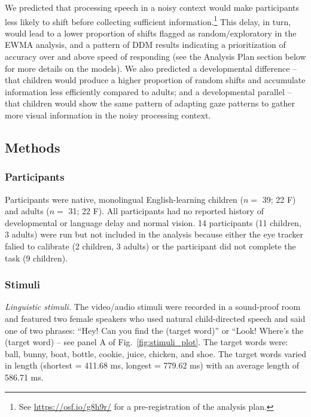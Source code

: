 \documentclass[english,floatsintext,man]{apa6}
\theoremstyle{definition}
\theoremstyle{definition}
\theoremstyle{definition}
\theoremstyle{remark}
\begin{document}
We predicted that processing speech in a noisy context would make
participants less likely to shift before collecting sufficient
information.\footnote{See \url{https://osf.io/g8h9r/} for a
  pre-registration of the analysis plan.} This delay, in turn, would
lead to a lower proportion of shifts flagged as random/exploratory in
the EWMA analysis, and a pattern of DDM results indicating a
prioritization of accuracy over and above speed of responding (see the
Analysis Plan section below for more details on the models). We also
predicted a developmental difference -- that children would produce a
higher proportion of random shifts and accumulate information less
efficiently compared to adults; and a developmental parallel -- that
children would show the same pattern of adapting gaze patterns to gather
more visual information in the noisy processing context.

\hypertarget{methods-2}{%
\subsection{Methods}\label{methods-2}}

\hypertarget{participants-2}{%
\subsubsection{Participants}\label{participants-2}}

Participants were native, monolingual English-learning children (\(n=\)
39; 22 F) and adults (\(n=\) 31; 22 F). All participants had no reported
history of developmental or language delay and normal vision. 14
participants (11 children, 3 adults) were run but not included in the
analysis because either the eye tracker falied to calibrate (2 children,
3 adults) or the participant did not complete the task (9 children).

\hypertarget{stimuli-2}{%
\subsubsection{Stimuli}\label{stimuli-2}}

\emph{Linguistic stimuli.} The video/audio stimuli were recorded in a
sound-proof room and featured two female speakers who used natural
child-directed speech and said one of two phrases: \enquote{Hey! Can you
find the (target word)} or ``Look! Where's the (target word) -- see
panel A of Fig.~\ref{fig:stimuli_plot}. The target words were: ball,
bunny, boat, bottle, cookie, juice, chicken, and shoe. The target words
varied in length (shortest = 411.68 ms, longest = 779.62 ms) with an
average length of 586.71 ms.
\end{document}
